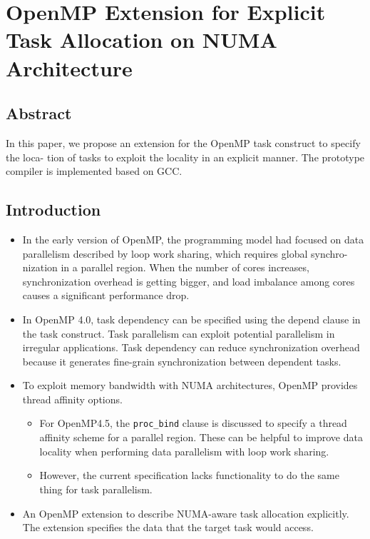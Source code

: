 \documentclass[11pt]{article}
\begin{document}
\section{OpenMP Extension for Explicit Task Allocation on NUMA Architecture \cite{10.1007/978-3-319-45550-1_7}}
\label{sec-5}
\subsection{Abstract}
\label{sec-5-1}
In this paper, we propose an extension for the OpenMP task construct to specify the loca- tion of tasks to exploit the locality in an explicit manner. The prototype compiler is implemented based on GCC.

\subsection{Introduction}
\label{sec-5-2}
\begin{itemize}
\item In the early version of OpenMP, the programming model had focused on data parallelism described by loop work sharing, which requires global synchro- nization in a parallel region. When the number of cores increases, synchronization overhead is getting bigger, and load imbalance among cores causes a significant performance drop.
\item In OpenMP 4.0, task dependency can be specified using the depend clause in the task construct. Task parallelism can exploit potential parallelism in irregular applications. Task dependency can reduce synchronization overhead because it generates fine-grain synchronization between dependent tasks.
\item To exploit memory bandwidth with NUMA architectures, OpenMP provides thread affinity options.
\begin{itemize}
\item For OpenMP4.5, the \texttt{proc\_bind} clause is discussed to specify a thread affinity scheme for a parallel region. These can be helpful to improve data locality when performing data parallelism with loop work sharing.
\item However, the current specification lacks functionality to do the same thing for task parallelism.
\end{itemize}
\item An OpenMP extension to describe NUMA-aware task allocation explicitly. The extension specifies the data that the target task would access.
\end{itemize}
\end{document}

